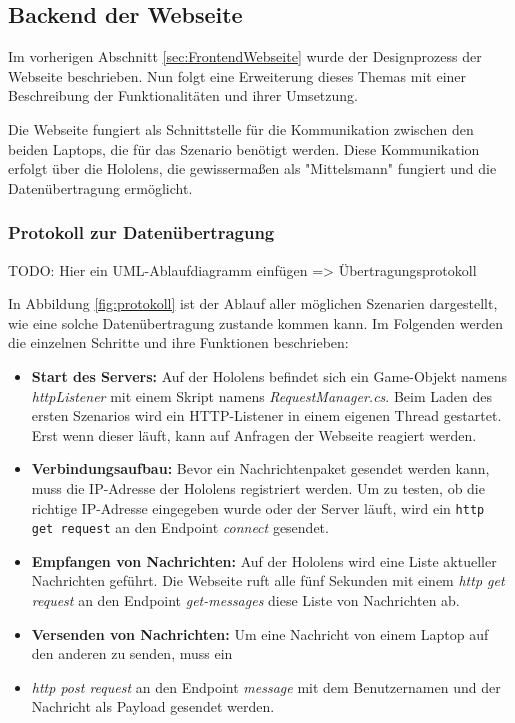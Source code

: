 \subsection{Backend der Webseite} 

Im vorherigen Abschnitt \ref{sec:FrontendWebseite} wurde der Designprozess der Webseite beschrieben. Nun folgt eine
Erweiterung dieses Themas mit einer Beschreibung der Funktionalitäten und ihrer Umsetzung.

Die Webseite fungiert als Schnittstelle für die Kommunikation zwischen den beiden Laptops, die für das Szenario benötigt
werden. Diese Kommunikation erfolgt über die Hololens, die gewissermaßen als "Mittelsmann" fungiert und die Datenübertragung ermöglicht.
\subsubsection{Protokoll zur Datenübertragung}

TODO: Hier ein UML-Ablaufdiagramm einfügen => Übertragungsprotokoll

In Abbildung \ref{fig:protokoll} ist der Ablauf aller möglichen Szenarien dargestellt, wie eine solche Datenübertragung
zustande kommen kann. Im Folgenden werden die einzelnen Schritte und ihre Funktionen beschrieben:

\begin{itemize}
    \item \textbf{Start des Servers:} Auf der Hololens befindet sich ein Game-Objekt namens \textit{httpListener} mit einem
    Skript namens \textit{RequestManager.cs}. Beim Laden des ersten Szenarios wird ein HTTP-Listener in einem eigenen Thread
    gestartet. Erst wenn dieser läuft, kann auf Anfragen der Webseite reagiert werden.
    \item \textbf{Verbindungsaufbau:} Bevor ein Nachrichtenpaket gesendet werden kann, muss die IP-Adresse der Hololens
    registriert werden. Um zu testen, ob die richtige IP-Adresse eingegeben wurde oder der Server läuft, wird ein
    \texttt{http get request} an den Endpoint \textit{connect} gesendet.
    \item \textbf{Empfangen von Nachrichten:} Auf der Hololens wird eine Liste aktueller Nachrichten geführt. Die Webseite
    ruft alle fünf Sekunden mit einem \textit{http get request} an den Endpoint \textit{get-messages} diese Liste von Nachrichten ab.
    \item \textbf{Versenden von Nachrichten:} Um eine Nachricht von einem Laptop auf den anderen zu senden, muss ein
    \item \textit{http post request} an den Endpoint \textit{message} mit dem Benutzernamen und der Nachricht als Payload gesendet werden.
\end{itemize}

